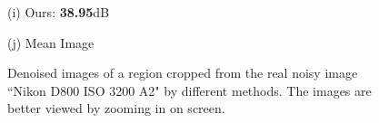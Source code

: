 \documentclass[10pt,onecolumn,letterpaper]{article}
\begin{document}
\begin{figure}[H]
{\begin{minipage}[t]{0.196\textwidth}
{\footnotesize (i) Ours: \textbf{38.95}dB  }
\end{minipage}
\begin{minipage}[t]{0.196\textwidth}
\centering
{}
{\footnotesize (j) Mean Image \cite{crosschannel2016} }
\end{minipage}
}
\caption{Denoised images of a region cropped from the real noisy image ``Nikon D800 ISO 3200 A2" \cite{crosschannel2016} by different methods. The images are better viewed by zooming in on screen.} 
\label{fig17}
\end{figure}
\end{document}
